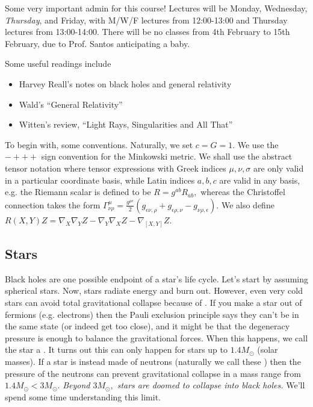 \begin{note}
Some very important admin for this course! Lectures will be Monday, Wednesday, \emph{Thursday}, and Friday, with M/W/F lectures from 12:00-13:00 and Thursday lectures from 13:00-14:00. There will be no classes from 4th February to 15th February, due to Prof. Santos anticipating a baby.

Some useful readings include
\begin{itemize}
    \item Harvey Reall's notes on black holes and general relativity
    \item Wald's ``General Relativity''
    \item Witten's review, ``Light Rays, Singularities and All That''
\end{itemize}
\end{note}

To begin with, some conventions. Naturally, we set $c=G=1$. We use the $-+++$ sign convention for the Minkowski metric. We shall use the abstract tensor notation where tensor expressions with Greek indices $\mu,\nu,\sigma$ are only valid in a particular coordinate basis, while Latin indices $a,b,c$ are valid in any basis, e.g. the Riemann scalar is defined to be $R=g^{ab}R_{ab},$ whereas the Christoffel connection takes the form $\Gamma^\mu_{\nu\rho}=\frac{g^{\mu\epsilon}}{2}(g_{\epsilon \nu,\rho}+g_{\epsilon \rho, \nu}-g_{\nu\rho,\epsilon}).$ We also define $R(X,Y)Z=\nabla_X \nabla_Y Z -\nabla_Y \nabla_X Z - \nabla_{[X,Y]}Z$.

\subsection*{Stars} Black holes are one possible endpoint of a star's life cycle. Let's start by assuming spherical stars. Now, stars radiate energy and burn out. However, even very cold stars can avoid total gravitational collapse because of . If you make a star out of fermions (e.g. electrons) then the Pauli exclusion principle says they can't be in the same state (or indeed get too close), and it might be that the degeneracy pressure is enough to balance the gravitational forces. When this happens, we call the star a . It turns out this can only happen for stars up to $1.4 M_\odot$ (solar masses). If a star is instead made of neutrons (naturally we call these ) then the pressure of the neutrons can prevent gravitational collapse in a mass range from $1.4 M_\odot < 3 M_\odot$.
\emph{Beyond $3 M_{\odot},$ stars are doomed to collapse into black holes.} We'll spend some time understanding this limit.


